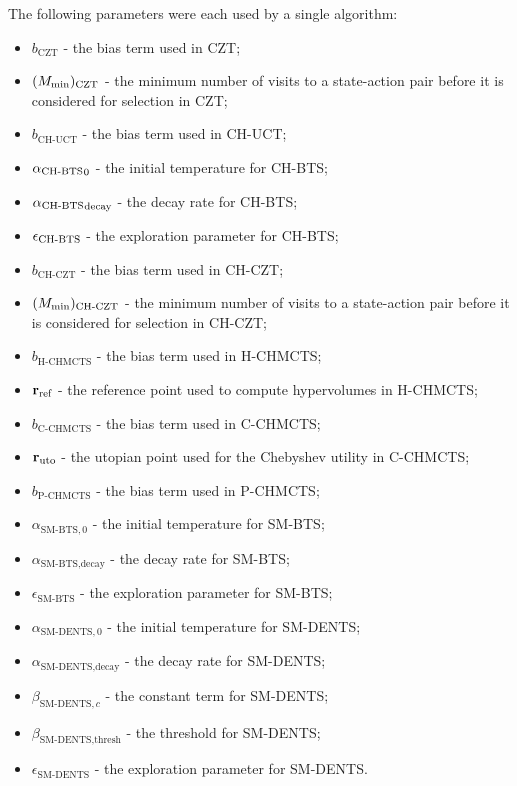     The following parameters were each used by a single algorithm:
    \begin{itemize}
        \item $b_{\text{CZT}}$ - the bias term used in CZT;
        \item $(M_{\textnormal{min}})_{\text{CZT}}$ - the minimum number of visits to a state-action pair before it is considered for selection in CZT;
        \item $b_{\text{CH-UCT}}$ - the bias term used in CH-UCT;
        \item ${\alpha_{{\textnormal{CH-BTS}}}}_{0}$ - the initial temperature for CH-BTS;
        \item ${\alpha_{{\textnormal{CH-BTS}}}}_{\text{decay}}$ - the decay rate for CH-BTS;
        \item ${\epsilon_{{\textnormal{CH-BTS}}}}$ - the exploration parameter for CH-BTS;
        \item $b_{\text{CH-CZT}}$ - the bias term used in CH-CZT;
        \item $(M_{\textnormal{min}})_{\text{CH-CZT}}$ - the minimum number of visits to a state-action pair before it is considered for selection in CH-CZT;
        \item $b_{\text{H-CHMCTS}}$ - the bias term used in H-CHMCTS;
        \item $\mathbf{r}_{\textnormal{ref}}$ - the reference point used to compute hypervolumes in H-CHMCTS;
        \item $b_{\text{C-CHMCTS}}$ - the bias term used in C-CHMCTS;
        \item $\mathbf{r}_{\textnormal{uto}}$ - the utopian point used for the Chebyshev utility in C-CHMCTS;
        \item $b_{\text{P-CHMCTS}}$ - the bias term used in P-CHMCTS;
        \item $\alpha_{\text{SM-BTS},0}$ - the initial temperature for SM-BTS;
        \item $\alpha_{\text{SM-BTS},\text{decay}}$ - the decay rate for SM-BTS;
        \item $\epsilon_{\text{SM-BTS}}$ - the exploration parameter for SM-BTS;
        \item $\alpha_{\text{SM-DENTS},0}$ - the initial temperature for SM-DENTS;
        \item $\alpha_{\text{SM-DENTS},\text{decay}}$ - the decay rate for SM-DENTS;
        \item $\beta_{\text{SM-DENTS},c}$ - the constant term for SM-DENTS;
        \item $\beta_{\text{SM-DENTS},\text{thresh}}$ - the threshold for SM-DENTS;
        \item $\epsilon_{\text{SM-DENTS}}$ - the exploration parameter for SM-DENTS.
    \end{itemize}






